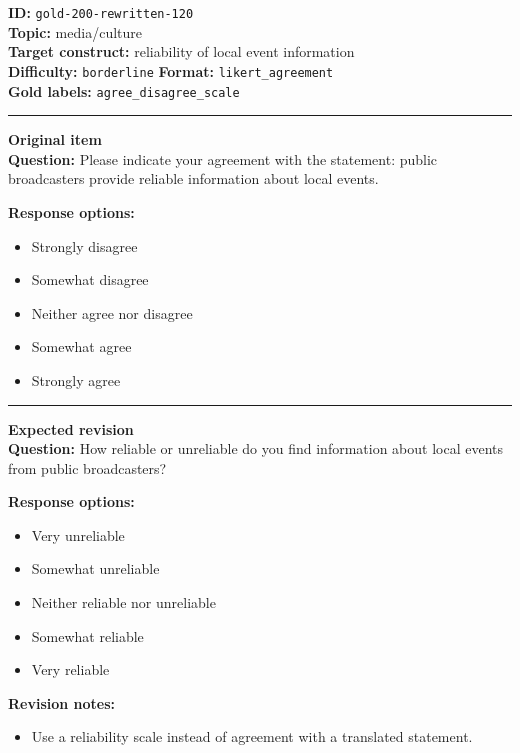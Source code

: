 \documentclass[10pt,a4paper]{article}
\newcommand{\sectionline}{\vspace{0.15em}\hrule\vspace{0.35em}}
\begin{document}
\begin{tcolorbox}[colframe=FlawRed,colback=white,colbacktitle=FlawRed!9,coltitle=black,title={Item 120\hfill Flawed item}]
\textbf{ID:} \texttt{gold-200-rewritten-120}\\
\textbf{Topic:} media/culture\\
\textbf{Target construct:} reliability of local event information\\
\textbf{Difficulty:} \texttt{borderline} \quad \textbf{Format:} \texttt{likert\_agreement}\\
\textbf{Gold labels:} \texttt{agree\_disagree\_scale}\\
\sectionline
\textbf{Original item}\\
\textbf{Question:} Please indicate your agreement with the statement: public broadcasters provide reliable information about local events.
\par\textbf{Response options:}
\begin{itemize}
\item Strongly disagree
\item Somewhat disagree
\item Neither agree nor disagree
\item Somewhat agree
\item Strongly agree
\end{itemize}
\sectionline
\textbf{Expected revision}\\
\textbf{Question:} How reliable or unreliable do you find information about local events from public broadcasters?
\par\textbf{Response options:}
\begin{itemize}
\item Very unreliable
\item Somewhat unreliable
\item Neither reliable nor unreliable
\item Somewhat reliable
\item Very reliable
\end{itemize}
\par\textbf{Revision notes:}
\begin{itemize}
\item Use a reliability scale instead of agreement with a translated statement.
\end{itemize}
\end{tcolorbox}
\end{document}
